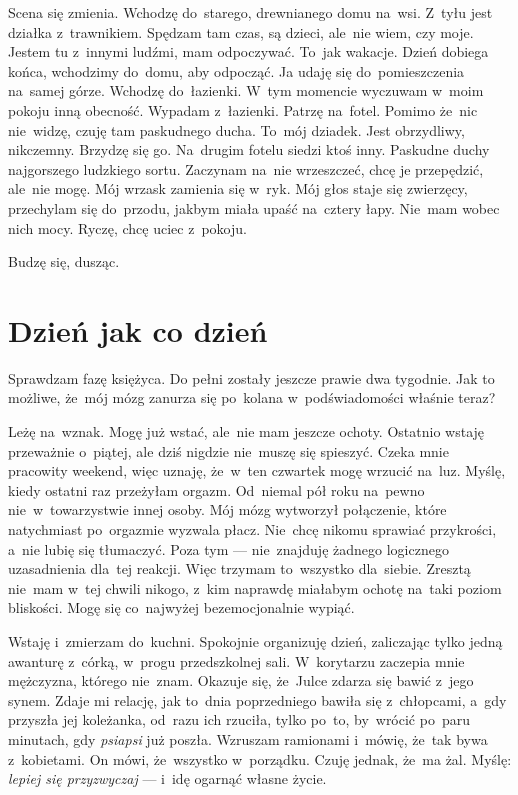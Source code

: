 \documentclass[9pt, a5paper]{memoir}
\begin{document}
Scena się zmienia. Wchodzę do~starego, drewnianego domu na~wsi. Z~tyłu jest działka z~trawnikiem. Spędzam tam czas, są dzieci, ale~nie wiem, czy moje. Jestem tu z~innymi ludźmi, mam odpoczywać. To~jak wakacje. Dzień dobiega końca, wchodzimy do~domu, aby odpocząć. Ja udaję się do~pomieszczenia na~samej górze. Wchodzę do~łazienki. W~tym momencie wyczuwam w~moim pokoju inną obecność. Wypadam z~łazienki. Patrzę na~fotel. Pomimo że~nic nie~widzę, czuję tam paskudnego ducha. To~mój dziadek. Jest obrzydliwy, nikczemny. Brzydzę się go. Na~drugim fotelu siedzi ktoś inny. Paskudne duchy najgorszego ludzkiego sortu. Zaczynam na~nie wrzeszczeć, chcę je przepędzić, ale~nie mogę. Mój wrzask zamienia się w~ryk. Mój głos staje się zwierzęcy, przechylam się do~przodu, jakbym miała upaść na~cztery łapy. Nie~mam wobec nich mocy. Ryczę, chcę uciec z~pokoju.

Budzę się, dusząc.

\newpage
\section{Dzień jak co dzień}
Sprawdzam fazę księżyca. Do pełni zostały jeszcze prawie dwa tygodnie. Jak to możliwe, że~mój mózg zanurza się po~kolana w~podświadomości właśnie teraz?

Leżę na~wznak. Mogę już wstać, ale~nie mam jeszcze ochoty. Ostatnio wstaję przeważnie o~piątej, ale dziś nigdzie nie~muszę się spieszyć. Czeka mnie pracowity weekend, więc uznaję, że~w~ten czwartek mogę wrzucić na~luz. Myślę, kiedy ostatni raz przeżyłam orgazm. Od~niemal pół roku na~pewno nie~w~towarzystwie innej osoby. Mój mózg wytworzył połączenie, które natychmiast po~orgazmie wyzwala płacz. Nie~chcę nikomu sprawiać przykrości, a~nie lubię się tłumaczyć. Poza tym --- nie~znajduję żadnego logicznego uzasadnienia dla~tej reakcji. Więc trzymam to~wszystko dla~siebie. Zresztą nie~mam w~tej chwili nikogo, z~kim naprawdę miałabym ochotę na~taki poziom bliskości. Mogę się co~najwyżej bezemocjonalnie wypiąć.

Wstaję i~zmierzam do~kuchni. Spokojnie organizuję dzień, zaliczając tylko jedną awanturę z~córką, w~progu przedszkolnej sali. W~korytarzu zaczepia mnie mężczyzna, którego nie~znam. Okazuje się, że~Julce zdarza się bawić z~jego synem. Zdaje mi relację, jak to~dnia poprzedniego bawiła się z~chłopcami, a~gdy przyszła jej koleżanka, od~razu ich rzuciła, tylko po~to, by~wrócić po~paru minutach, gdy \textit{psiapsi} już poszła. Wzruszam ramionami i~mówię, że~tak bywa z~kobietami. On mówi, że~wszystko w~porządku. Czuję jednak, że~ma żal. Myślę: \textit{lepiej się przyzwyczaj} --- i~idę ogarnąć własne życie.
\end{document}
